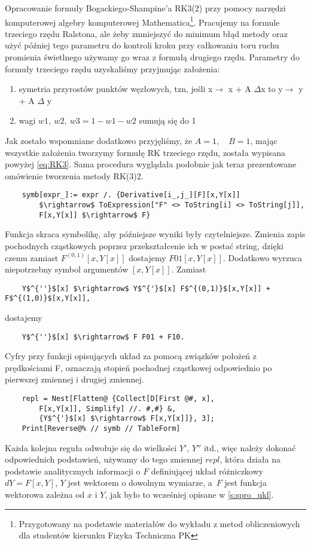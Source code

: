 Opracowanie formuły Bogackiego-Shampine'a RK3(2) przy pomocy narzędzi komputerowej algebry komputerowej Mathematica\footnote{Przygotowany na podstawie materiałów do wykładu z metod obliczeniowych dla studentów kierunku
Fizyka Techniczna PK}. Pracujemy na formule trzeciego rzędu Ralstona, ale żeby zmniejszyć do minimum błąd metody oraz użyć później tego parametru do kontroli kroku przy całkowaniu toru ruchu promienia świetlnego używamy go wraz z formułą drugiego rzędu. Parametry do formuły trzeciego rzędu uzyskaliśmy przyjmując założenia:
\begin{enumerate}
\item symetria przyrostów punktów węzłowych, tzn, jeśli x$\rightarrow$ x + A $\Delta$x to y$\rightarrow$ y + A $\Delta$ y
\item wagi $w1,~w2,~w3 = 1-w1-w2$ sumują się do 1
\end{enumerate}
Jak zostało wspomniane dodatkowo przyjęliśmy, że $A=1, \quad B=1$, mając wszystkie założenia tworzymy formułę RK trzeciego rzędu, została wypisana powyżej \ref{eq:RK3}. Sama procedura wyglądała podobnie jak teraz prezentowane omówienie tworzenia metody RK(3)2.
\begin{lstlisting}
    symb[expr_]:= expr /. {Derivative[i_,j_][F][x,Y[x]] 
        $\rightarrow$ ToExpression["F" <> ToString[i] <> ToString[j]], 
        F[x,Y[x]] $\rightarrow$ F}
\end{lstlisting}
Funkcja skraca symbolikę, aby późniejsze wyniki były czytelniejsze. Zmienia zapis pochodnych cząstkowych poprzez przekształcenie ich w postać string, dzięki czemu zamiast $F^{(0,1)}[x,Y[x]]$ dostajemy $F01[x,Y[x]]$. Dodatkowo wyrzuca niepotrzebny symbol argumentów $[x,Y[x]].$ Zamiast \begin{lstlisting} 
    Y$^{''}$[x] $\rightarrow$ Y$^{'}$[x] F$^{(0,1)}$[x,Y[x]] + F$^{(1,0)}$[x,Y[x]], \end{lstlisting} 
dostajemy 
\begin{lstlisting} 
    Y$^{''}$[x] $\rightarrow$ F F01 + F10.\end{lstlisting} Cyfry przy funkcji opisujących układ za pomocą związków położeń z prędkościami F, oznaczają stopień pochodnej cząstkowej odpowiednio po pierwszej zmiennej i drugiej zmiennej.
\begin{lstlisting}
    repl = Nest[Flatten@ {Collect[D[First @#, x], 
        F[x,Y[x]], Simplify] //. #,#} &, 
        {Y$^{'}$[x] $\rightarrow$ F[x,Y[x]]}, 3];
    Print[Reverse@% // symb // TableForm]
\end{lstlisting}
Każda kolejna reguła odwołuje się do wielkości $Y'$, $Y''$ itd., więc należy dokonać odpowiednich podstawień, używamy do tego zmiennej $repl$, która działa na podstawie analitycznych informacji o $F$ definiującej układ różniczkowy $dY = F[x, Y]$, $Y$ jest wektorem o dowolnym wymiarze, a~$F$ jest funkcja wektorowa zależna od $x$ i $Y$, jak było to wcześniej opisane w \ref{s:spro_ukl}.
